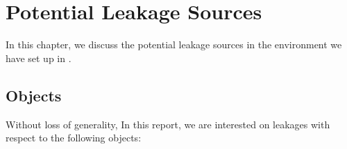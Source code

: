 \chapter{Potential Leakage Sources}

In this chapter, we discuss the potential leakage sources in the environment we have set up in . 


%
%
%

\section{Objects} \label{Sec: Objects}

Without loss of generality, In this report, we are interested on leakages with respect to the following objects:

